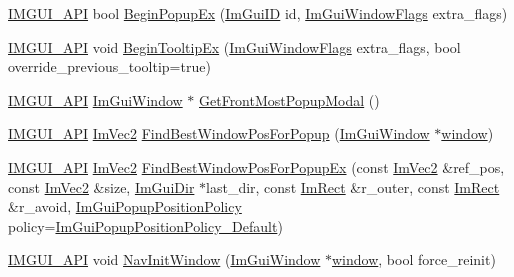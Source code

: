 \begin{DoxyCompactItemize}
\item 
\mbox{\hyperlink{imgui_8h_a43829975e84e45d1149597467a14bbf5}{I\+M\+G\+U\+I\+\_\+\+A\+PI}} bool \mbox{\hyperlink{namespace_im_gui_a89da3a22300e8293257b6cfdf1b83b7a}{Begin\+Popup\+Ex}} (\mbox{\hyperlink{imgui_8h_a1785c9b6f4e16406764a85f32582236f}{Im\+Gui\+ID}} id, \mbox{\hyperlink{imgui_8h_a0b8e067ab4f7a818828c8d89e531addc}{Im\+Gui\+Window\+Flags}} extra\+\_\+flags)
\item 
\mbox{\hyperlink{imgui_8h_a43829975e84e45d1149597467a14bbf5}{I\+M\+G\+U\+I\+\_\+\+A\+PI}} void \mbox{\hyperlink{namespace_im_gui_a3189530b7795a9b99169eb95f36c516d}{Begin\+Tooltip\+Ex}} (\mbox{\hyperlink{imgui_8h_a0b8e067ab4f7a818828c8d89e531addc}{Im\+Gui\+Window\+Flags}} extra\+\_\+flags, bool override\+\_\+previous\+\_\+tooltip=true)
\item 
\mbox{\hyperlink{imgui_8h_a43829975e84e45d1149597467a14bbf5}{I\+M\+G\+U\+I\+\_\+\+A\+PI}} \mbox{\hyperlink{struct_im_gui_window}{Im\+Gui\+Window}} $\ast$ \mbox{\hyperlink{namespace_im_gui_a780ad366ee59b123675d598136011970}{Get\+Front\+Most\+Popup\+Modal}} ()
\item 
\mbox{\hyperlink{imgui_8h_a43829975e84e45d1149597467a14bbf5}{I\+M\+G\+U\+I\+\_\+\+A\+PI}} \mbox{\hyperlink{struct_im_vec2}{Im\+Vec2}} \mbox{\hyperlink{namespace_im_gui_a310ff87cbe678e2c632bf1f5577a7fbd}{Find\+Best\+Window\+Pos\+For\+Popup}} (\mbox{\hyperlink{struct_im_gui_window}{Im\+Gui\+Window}} $\ast$\mbox{\hyperlink{radar_8cpp_a80de27bd7dc4e2b2ad3d5895b97a70f0}{window}})
\item 
\mbox{\hyperlink{imgui_8h_a43829975e84e45d1149597467a14bbf5}{I\+M\+G\+U\+I\+\_\+\+A\+PI}} \mbox{\hyperlink{struct_im_vec2}{Im\+Vec2}} \mbox{\hyperlink{namespace_im_gui_a4159d978951d11bb8be459911ae58db2}{Find\+Best\+Window\+Pos\+For\+Popup\+Ex}} (const \mbox{\hyperlink{struct_im_vec2}{Im\+Vec2}} \&ref\+\_\+pos, const \mbox{\hyperlink{struct_im_vec2}{Im\+Vec2}} \&size, \mbox{\hyperlink{imgui_8h_a874086389bc27cc9647118d22a806403}{Im\+Gui\+Dir}} $\ast$last\+\_\+dir, const \mbox{\hyperlink{struct_im_rect}{Im\+Rect}} \&r\+\_\+outer, const \mbox{\hyperlink{struct_im_rect}{Im\+Rect}} \&r\+\_\+avoid, \mbox{\hyperlink{imgui__internal_8h_a9c122103feadc7b225fc21698ff0f4d8}{Im\+Gui\+Popup\+Position\+Policy}} policy=\mbox{\hyperlink{imgui__internal_8h_a9c122103feadc7b225fc21698ff0f4d8ab8a9815cfc6ed3f721aa8e75d960dbdf}{Im\+Gui\+Popup\+Position\+Policy\+\_\+\+Default}})
\item 
\mbox{\hyperlink{imgui_8h_a43829975e84e45d1149597467a14bbf5}{I\+M\+G\+U\+I\+\_\+\+A\+PI}} void \mbox{\hyperlink{namespace_im_gui_ae46a79d836c4b223c7030ea432e3ec15}{Nav\+Init\+Window}} (\mbox{\hyperlink{struct_im_gui_window}{Im\+Gui\+Window}} $\ast$\mbox{\hyperlink{radar_8cpp_a80de27bd7dc4e2b2ad3d5895b97a70f0}{window}}, bool force\+\_\+reinit)

\end{DoxyCompactItemize}
